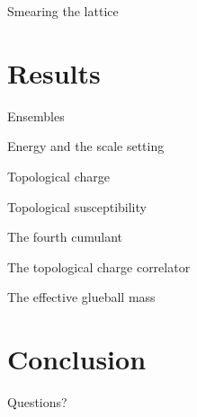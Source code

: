\documentclass[10pt,show notes on second screen]{beamer}
\begin{document}
\begin{frame}{Smearing the lattice}
\end{frame}

\section{Results}

\begin{frame}{Ensembles}
\end{frame}

\begin{frame}{Energy and the scale setting}
\end{frame}

\begin{frame}{Topological charge}
\end{frame}

\begin{frame}{Topological susceptibility}
\end{frame}

\begin{frame}{The fourth cumulant}
\end{frame}

\begin{frame}{The topological charge correlator}
\end{frame}

\begin{frame}{The effective glueball mass}
\end{frame}

\section{Conclusion}
\begin{frame}
\end{frame}

\begin{frame}
Questions?
\end{frame}


\end{document}
